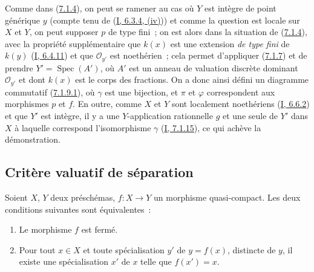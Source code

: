 Comme dans (\hyperref[II.7.1.4-fr]{7.1.4}), on peut se ramener au cas où $Y$
est intègre de point générique $y$ (compte tenu de
(\hyperref[I.6.3.4-fr]{I, 6.3.4, (iv)})) et comme la question est locale sur
$X$ et $Y$, on peut supposer $p$ de type fini~; on est alors dans la situation
de (\hyperref[II.7.1.4-fr]{7.1.4}), avec la propriété supplémentaire que
$k(x)$ est une extension \emph{de type fini} de $k(y)$
(\hyperref[I.6.4.11-fr]{I, 6.4.11}) et que $\mathcal{O}_{y'}$ est noethérien~;
cela permet d'appliquer (\hyperref[II.7.1.7-fr]{7.1.7}) et de prendre
$Y'=\operatorname{Spec}(A')$, où $A'$ est un anneau de valuation discrète
dominant $\mathcal{O}_{y'}$ et dont $k(x)$ est le corps des fractions. On a
donc ainsi défini un diagramme commutatif
(\hyperref[II.7.1.9.1-fr]{7.1.9.1}), où $\gamma$ est une bijection, et $\pi$
et $\varphi$ correspondent aux morphismes $p$ et $f$. En outre, comme $X$ et
$Y$ sont localement noethériens (\hyperref[I.6.6.2-fr]{I, 6.6.2}) et que $Y'$
est intègre, il y a une $Y$-application rationnelle $g$ et une seule de $Y'$
dans $X$ à laquelle correspond l'isomorphisme $\gamma$
(\hyperref[I.7.1.15-fr]{I, 7.1.15}), ce qui achève la démonstration.

\subsection{Critère valuatif de séparation}
\label{subsection:II.7.2-fr}

\begin{proposition}[7.2.1]
\label{II.7.2.1-fr}
Soient $X$, $Y$ deux préschémas, $f:X\to Y$ un morphisme quasi-compact. Les
deux conditions suivantes sont équivalentes~:
\begin{enumerate}
\item[\rm a)] Le morphisme $f$ est fermé.
\item[\rm b)] Pour tout $x\in X$ et toute spécialisation $y'$ de $y=f(x)$,
distincte de $y$, il existe une spécialisation $x'$ de $x$ telle que
$f(x')=x$.
\end{enumerate}
\end{proposition}

